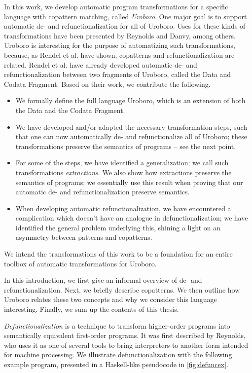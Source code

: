 In this work, we develop automatic program transformations for a specific language with copattern matching, called \textit{Uroboro}. One major goal is to support automatic de- and refunctionalization for all of Uroboro. Uses for these kinds of transformations have been presented by Reynolds and Danvy, among others. Uroboro is interesting for the purpose of automatizing such transformations, because, as Rendel et al.\cite{rendel15automatic} have shown, copatterns and refunctionalization are related. Rendel et al. have already developed automatic de- and refunctionalization between two fragments of Uroboro, called the Data and Codata Fragment. Based on their work, we contribute the following.
\begin{itemize}
\item We formally define the full language Uroboro, which is an extension of both the Data and the Codata Fragment.

\item We have developed and/or adapted the necessary transformation steps, such that one can now automatically de- and refunctionalize all of Uroboro; these transformations preserve the semantics of programs -- see the next point.

\item For some of the steps, we have identified a generalization; we call such transformations \textit{extractions}. We also show how extractions preserve the semantics of programs; we essentially use this result when proving that our automatic de- and refunctionalization preserve semantics.

\item When developing automatic refunctionalization, we have encountered a complication which doesn't have an analogue in defunctionalization; we have identified the general problem underlying this, shining a light on an asymmetry between patterns and copatterns.
\end{itemize}
We intend the transformations of this work to be a foundation for an entire toolbox of automatic transformations for Uroboro.

In this introduction, we first give an informal overview of de- and refunctionalization. Next, we briefly describe copatterns. We then outline how Uroboro relates these two concepts and why we consider this language interesting. Finally, we sum up the contents of this thesis.

\textit{Defunctionalization} is a technique to transform higher-order programs into semantically equivalent first-order programs. It was first described by Reynolds\cite{reynolds72definitional}, who uses it as one of several tools to bring interpreters to another form intended for machine processing. We illustrate defunctionalization with the following example program, presented in a Haskell-like pseudocode in \autoref{fig:defuncex}.


